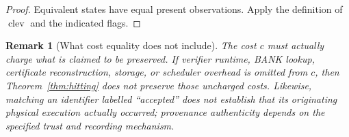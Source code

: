 \documentclass[11pt,letterpaper]{article}
\newtheorem{remark}[theorem]{Remark}
\newcommand{\clev}{\operatorname{clev}}
\begin{document}
\begin{proof}
Equivalent states have equal present observations. Apply the definition of $\clev$ and the indicated flags.
\end{proof}
\begin{remark}[What cost equality does not include]
The cost $c$ must actually charge what is claimed to be preserved. If verifier runtime, BANK lookup, certificate reconstruction, storage, or scheduler overhead is omitted from $c$, then Theorem~\ref{thm:hitting} does not preserve those uncharged costs. Likewise, matching an identifier labelled ``accepted'' does not establish that its originating physical execution actually occurred; provenance authenticity depends on the specified trust and recording mechanism.
\end{remark}
\end{document}
